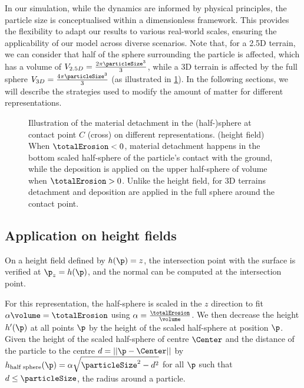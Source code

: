In our simulation, while the dynamics are informed by physical principles, the particle size is conceptualised within a dimensionless framework. This provides the flexibility to adapt our results to various real-world scales, ensuring the applicability of our model across diverse scenarios.  
Note that, for a 2.5D terrain, we can consider that half of the sphere surrounding the particle is affected, which has a volume of $V_{2.5D} = \frac{2 \pi \particleSize^3}{3}$, while a 3D terrain is affected by the full sphere $V_{3D} = \frac{4 \pi \particleSize^3}{3}$ (as illustrated in \cref{fig:erosion-erosion-heightfield}). In the following sections, we will describe the strategies used to modify the amount of matter for different representations. 

\begin{figure}
    \caption{Illustration of the material detachment in the (half-)sphere at contact point $C$ (cross) on different representations. (height field) When $\totalErosion < 0$, material detachment happens in the bottom scaled half-sphere of the particle's contact with the ground, while the deposition is applied on the upper half-sphere of volume when $\totalErosion > 0$. Unlike the height field, for 3D terrains detachment and deposition are applied in the full sphere around the contact point.}
    \label{fig:erosion-erosion-heightfield}
\end{figure}

\subsection{Application on height fields}
\label{sec:erosion-application_on_heightmaps}

On a height field defined by $h(\p) = z$, the intersection point with the surface is verified at $\p_z = h(\p)$, and the normal can be computed at the intersection point. 

For this representation, the half-sphere is scaled in the $z$ direction to fit $\alpha \volume = \totalErosion$ using $\alpha = \frac{\totalErosion}{\volume}$. We then decrease the height $h'(\p)$ at all points $\p$ by the height of the scaled half-sphere at position $\p$. Given the height of the scaled half-sphere of centre $\Center$ and the distance of the particle to the centre $d = ||\p - \Center||$ by $h_\text{half sphere}(\p) = \alpha \sqrt{\particleSize^2 - d^2}$ for all $\p$ such that $d \leq \particleSize$, the radius around a particle.

